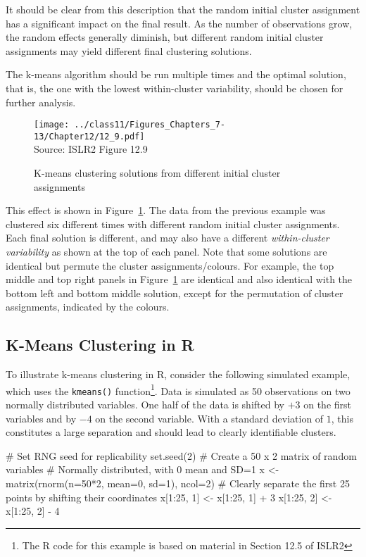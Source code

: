 It should be clear from this description that the random initial cluster assignment has a significant impact on the final result. As the number of observations grow, the random effects generally diminish, but different random initial cluster assignments may yield different final clustering solutions. 

\begin{alertbox}
The k-means algorithm should be run multiple times and the optimal solution, that is, the one with the lowest within-cluster variability, should be chosen for further analysis.
\end{alertbox}


\begin{figure}
\centering
\texttt{[image: ../class11/Figures\_Chapters\_7-13/Chapter12/12\_9.pdf]} \\

\scriptsize Source: ISLR2 Figure 12.9
\caption{K-means clustering solutions from different initial cluster assignments}
\label{fig:kmeans2}
\end{figure}

This effect is shown in Figure~\ref{fig:kmeans2}. The data from the previous example was clustered six different times with different random initial cluster assignments. Each final solution is different, and may also have a different \emph{within-cluster variability} as shown at the top of each panel. Note that some solutions are identical but permute the cluster assignments/colours. For example, the top middle and top right panels in Figure~\ref{fig:kmeans2} are identical and also identical with the bottom left and bottom middle solution, except for the permutation of cluster assignments, indicated by the colours. 

\subsection{K-Means Clustering in R}

To illustrate k-means clustering in R, consider the following simulated example, which uses the \texttt{kmeans()} function\footnote{The R code for this example is based on material in Section 12.5 of ISLR2}. Data is simulated as 50 observations on two normally distributed variables. One half of the data is shifted by $+3$ on the first variables and by $-4$ on the second variable. With a standard deviation of $1$, this constitutes a large separation and should lead to clearly identifiable clusters.

\begin{Rcode}
# Set RNG seed for replicability
set.seed(2)
# Create a 50 x 2 matrix of random variables 
# Normally distributed, with 0 mean and SD=1
x <- matrix(rnorm(n=50*2, mean=0, sd=1), ncol=2)
# Clearly separate the first 25 points by shifting their coordinates
x[1:25, 1] <- x[1:25, 1] + 3
x[1:25, 2] <- x[1:25, 2] - 4
\end{Rcode}

